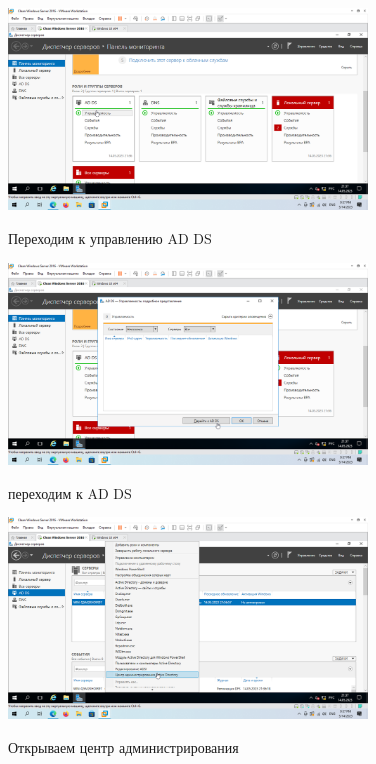 \documentclass[a4paper]{article}
\begin{document}
  \begin{figure}[H]
    \centering
    \includegraphics[width=0.85\textwidth]{5_0077}
    \label{img:77}
    \caption{Переходим к управлению AD DS}
  \end{figure}

  \begin{figure}[H]
    \centering
    \includegraphics[width=0.85\textwidth]{5_0078}
    \label{img:78}
    \caption{переходим к AD DS}
  \end{figure}

  \begin{figure}[H]
    \centering
    \includegraphics[width=0.85\textwidth]{5_0079}
    \label{img:79}
    \caption{Открываем центр администрирования}
  \end{figure}
\end{document}
